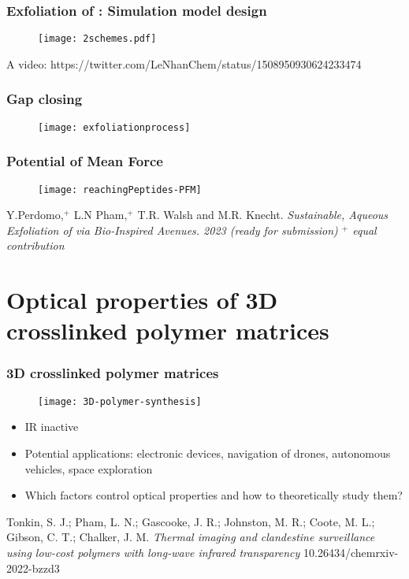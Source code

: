 \documentclass[xcolor=table,aspectratio=169]{beamer}
\begin{document}
\begin{frame}
	\frametitle{Exfoliation of : Simulation model design}
	\begin{figure}
		\texttt{[image: 2schemes.pdf]}
	\end{figure}
	A video: https://twitter.com/LeNhanChem/status/1508950930624233474

\end{frame}

\begin{frame}
	\frametitle{Gap closing}
	\begin{figure}
		\texttt{[image: exfoliationprocess]}
	\end{figure}

\end{frame}



\begin{frame}
	\frametitle{Potential of Mean Force}
	\begin{figure}
		\texttt{[image: reachingPeptides-PFM]}
	\end{figure}
	\tiny{Y.Perdomo,$^+$ L.N Pham,$^+$ T.R. Walsh and M.R.
		Knecht. \emph{Sustainable, Aqueous Exfoliation of  via Bio-Inspired Avenues.
			2023 (ready for submission) $^+$ equal contribution}}
\end{frame}


\section[3D crosslinked polymer matrices]{Optical properties of 3D crosslinked polymer matrices}

\begin{frame}
	\frametitle{3D crosslinked polymer matrices}
	\begin{figure}
		\texttt{[image: 3D-polymer-synthesis]}
	\end{figure}
	\begin{itemize}
		\item IR inactive
		\item Potential applications: electronic devices, navigation of drones, autonomous vehicles, space exploration
		\item Which factors control optical properties and how to theoretically study them?
	\end{itemize}
	\tiny{Tonkin, S. J.; Pham, L. N.; Gascooke, J. R.; Johnston, M. R.; Coote, M. L.; Gibson, C. T.; Chalker, J. M.
		\emph{Thermal imaging and clandestine surveillance using low-cost polymers with long-wave infrared transparency} 10.26434/chemrxiv-2022-bzzd3}
\end{frame}
\end{document}
